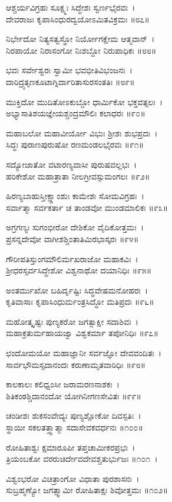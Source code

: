 	ಆಶ್ಚರ್ಯವಿಗ್ರಹಃ ಸೂಕ್ಷ್ಮಃ ಸಿದ್ಧೇಶಃ ಸ್ವರ್ಣಭೈರವಃ~।\\
	ದೇವರಾಜಃ ಕೃಪಾಸಿಂಧುರದ್ವಯೋಽಮಿತವಿಕ್ರಮಃ ॥೮೭॥

ನಿರ್ಭೇದೋ ನಿತ್ಯಸತ್ವಸ್ಥೋ ನಿರ್ಯೋಗಕ್ಷೇಮ ಆತ್ಮವಾನ್~।\\
ನಿರಪಾಯೋ ನಿರಾಸಂಗೋ ನಿಃಶಬ್ದೋ ನಿರುಪಾಧಿಕಃ ॥೮೮॥

	ಭವಃ ಸರ್ವೇಶ್ವರಃ ಸ್ವಾಮೀ ಭವಭೀತಿವಿಭಂಜನಃ~।\\
	ದಾರಿದ್ರ್ಯತೃಣಕೂಟಾಗ್ನಿರ್ದಾರಿತಾಸುರಸಂತತಿಃ ॥೮೯॥

ಮುಕ್ತಿದೋ ಮುದಿತೋಽಕುಬ್ಜೋ ಧಾರ್ಮಿಕೋ ಭಕ್ತವತ್ಸಲಃ~।\\
ಅಭ್ಯಾಸಾತಿಶಯಜ್ಞೇಯಶ್ಚಂದ್ರಮೌಲಿಃ ಕಲಾಧರಃ ॥೯೦॥

	ಮಹಾಬಲೋ ಮಹಾವೀರ್ಯೋ ವಿಭುಃ ಶ್ರೀಶಃ ಶುಭಪ್ರದಃ~।\\
	ಸಿದ್ಧಃ ಪುರಾಣಪುರುಷೋ ರಣಮಂಡಲಭೈರವಃ ॥೯೧॥

ಸದ್ಯೋಜಾತೋ ವಟಾರಣ್ಯವಾಸೀ ಪುರುಷವಲ್ಲಭಃ~।\\
ಹರಿಕೇಶೋ ಮಹಾತ್ರಾತಾ ನೀಲಗ್ರೀವಸ್ಸುಮಂಗಲಃ ॥೯೨॥

	ಹಿರಣ್ಯಬಾಹುಸ್ತೀಕ್ಷ್ಣಾಂಶುಃ ಕಾಮೇಶಃ ಸೋಮವಿಗ್ರಹಃ~।\\
	ಸರ್ವಾತ್ಮಾ ಸರ್ವಕರ್ತಾ ಚ ತಾಂಡವೋ ಮುಂಡಮಾಲಿಕಃ ॥೯೩॥

ಅಗ್ರಗಣ್ಯಃ ಸುಗಂಭೀರೋ ದೇಶಿಕೋ ವೈದಿಕೋತ್ತಮಃ~।\\
ಪ್ರಸನ್ನದೇವೋ ವಾಗೀಶಶ್ಚಿಂತಾತಿಮಿರಭಾಸ್ಕರಃ ॥೯೪॥

	ಗೌರೀಪತಿಸ್ತುಂಗಮೌಲಿರ್ಮಖರಾಜೋ ಮಹಾಕವಿಃ~।\\
	ಶ್ರೀಧರಸ್ಸರ್ವಸಿದ್ಧೇಶೋ ವಿಶ್ವನಾಥೋ ದಯಾನಿಧಿಃ ॥೯೫॥

ಅಂತರ್ಮುಖೋ ಬಹಿರ್ದೃಷ್ಟಿಃ ಸಿದ್ಧವೇಷಮನೋಹರಃ~।\\
ಕೃತಿವಾಸಾಃ ಕೃಪಾಸಿಂಧುರ್ಮಂತ್ರಸಿದ್ಧೋ ಮತಿಪ್ರದಃ ॥೯೬॥

	ಮಹೋತ್ಕೃಷ್ಟಃ ಪುಣ್ಯಕರೋ ಜಗತ್ಸಾಕ್ಷೀ ಸದಾಶಿವಃ~।\\
	ಮಹಾಕ್ರತುರ್ಮಹಾಯಜ್ವಾ ವಿಶ್ವಕರ್ಮಾ ತಪೋನಿಧಿಃ ॥೯೭॥

ಛಂದೋಮಯೋ ಮಹಾಜ್ಞಾನೀ ಸರ್ವಜ್ಞೋ ದೇವವಂದಿತಃ~।\\
ಸಾರ್ವಭೌಮಸ್ಸದಾನಂದಃ ಕರುಣಾಮೃತವಾರಿಧಿಃ ॥೯೮॥

	ಕಾಲಕಾಲಃ ಕಲಿಧ್ವಂಸೀ ಜರಾಮರಣನಾಶಕಃ~।\\
	ಶಿತಿಕಂಠಶ್ಚಿದಾನಂದೋ ಯೋಗಿನೀಗಣಸೇವಿತಃ ॥೯೯॥

ಚಂಡೀಶಃ ಶುಕಸಂವೇದ್ಯಃ ಪುಣ್ಯಶ್ಲೋಕೋ ದಿವಸ್ಪತಿಃ~।\\
ಸ್ಥಾಯೀ ಸಕಲತತ್ತ್ವಾತ್ಮಾ ಸದಾಸೇವಕವರ್ಧನಃ ॥೧೦೦॥

	ರೋಹಿತಾಶ್ವಃ ಕ್ಷಮಾರೂಪೀ ತಪ್ತಚಾಮೀಕರಪ್ರಭಃ~।\\
	ತ್ರಿಯಂಬಕೋ ವರರುಚಿರ್ದೇವದೇವಶ್ಚತುರ್ಭುಜಃ ॥೧೦೧~।

ವಿಶ್ವಂಭರೋ ವಿಚಿತ್ರಾಂಗೋ ವಿಧಾತಾ ಪುರಶಾಸನಃ~।\\
ಸುಬ್ರಹ್ಮಣ್ಯೋ ಜಗತ್ಸ್ವಾಮೀ ರೋಹಿತಾಕ್ಷಃ ಶಿವೋತ್ತಮಃ ॥೧೦೨॥

